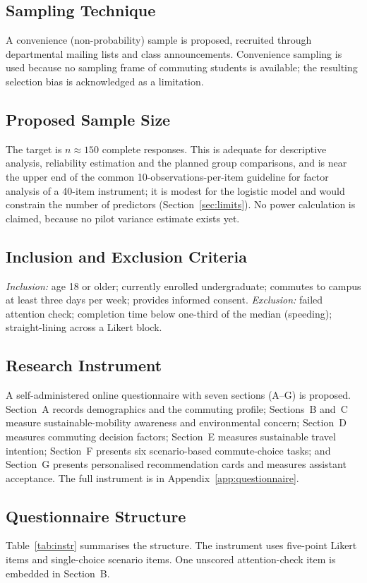 \documentclass[11pt,a4paper]{article}
\begin{document}
\subsection{Sampling Technique}
A convenience (non-probability) sample is proposed, recruited through departmental mailing lists and
class announcements. Convenience sampling is used because no sampling frame of commuting students is
available; the resulting selection bias is acknowledged as a limitation.

\subsection{Proposed Sample Size}
The target is $n \approx 150$ complete responses. This is adequate for descriptive analysis,
reliability estimation and the planned group comparisons, and is near the upper end of the common
10-observations-per-item guideline for factor analysis of a 40-item instrument; it is modest for the
logistic model and would constrain the number of predictors (Section~\ref{sec:limits}). No power
calculation is claimed, because no pilot variance estimate exists yet.

\subsection{Inclusion and Exclusion Criteria}
\textit{Inclusion:} age 18 or older; currently enrolled undergraduate; commutes to campus at least
three days per week; provides informed consent. \textit{Exclusion:} failed attention check;
completion time below one-third of the median (speeding); straight-lining across a Likert block.

\subsection{Research Instrument}
A self-administered online questionnaire with seven sections (A--G) is proposed. Section~A records
demographics and the commuting profile; Sections~B and~C measure sustainable-mobility awareness and
environmental concern; Section~D measures commuting decision factors; Section~E measures sustainable
travel intention; Section~F presents six scenario-based commute-choice tasks; and Section~G presents
personalised recommendation cards and measures assistant acceptance. The full instrument is in
Appendix~\ref{app:questionnaire}.

\subsection{Questionnaire Structure}
Table~\ref{tab:instr} summarises the structure. The instrument uses five-point Likert items and
single-choice scenario items. One unscored attention-check item is embedded in Section~B.
\end{document}
